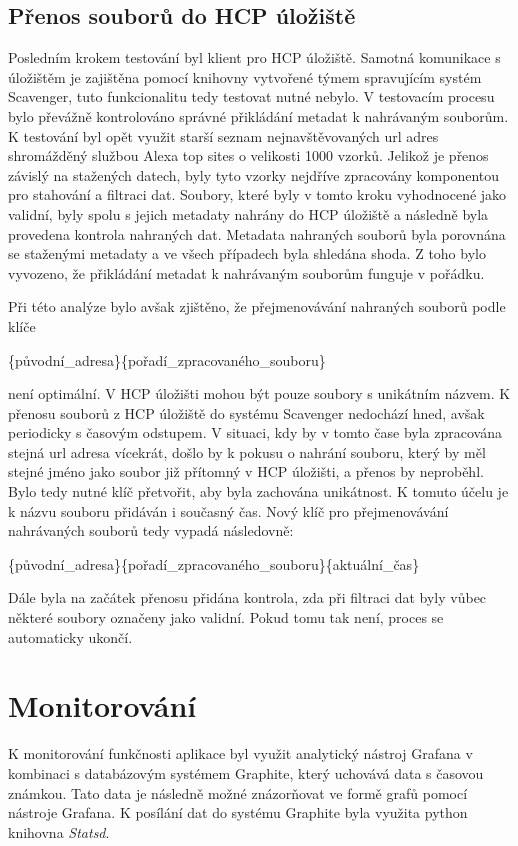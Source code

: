\documentclass[thesis=M,czech,hidelinks]{FITthesis}[2013/05/06]
\begin{document}
\subsection{Přenos souborů do HCP úložiště}
Posledním krokem testování byl klient pro HCP úložiště. Samotná komunikace s úložištěm je zajištěna pomocí knihovny vytvořené týmem spravujícím systém Scavenger, tuto funkcionalitu tedy testovat nutné nebylo. V testovacím procesu bylo převážně kontrolováno správné přikládání metadat k nahrávaným souborům. K testování byl opět využit starší seznam nejnavštěvovaných url adres shromážděný službou Alexa top sites\cite{alexa} o velikosti 1000 vzorků. Jelikož je přenos závislý na stažených datech, byly tyto vzorky nejdříve zpracovány komponentou pro stahování a filtraci dat. Soubory, které byly v tomto kroku vyhodnocené jako validní, byly spolu s jejich metadaty nahrány do HCP úložiště a následně byla provedena kontrola nahraných dat. Metadata nahraných souborů byla porovnána se staženými metadaty a ve všech případech byla shledána shoda. Z toho bylo vyvozeno, že přikládání metadat k nahrávaným souborům funguje v pořádku. 

Při této analýze bylo avšak zjištěno, že přejmenovávání nahraných souborů podle klíče
\begin{center}\label{prej}
\{původní\_adresa\}\{pořadí\_zpracovaného\_souboru\}
\end{center}
 není optimální. V HCP úložišti mohou být pouze soubory s unikátním názvem. K přenosu souborů z HCP úložiště do systému Scavenger nedochází hned, avšak periodicky s časovým odstupem. V situaci, kdy by v tomto čase byla zpracována stejná url adresa vícekrát, došlo by k pokusu o nahrání souboru, který by měl stejné jméno jako soubor již přítomný v HCP úložišti, a přenos by neproběhl. Bylo tedy nutné klíč přetvořit, aby byla zachována unikátnost. K tomuto účelu je k názvu souboru přidáván i současný čas. Nový klíč pro přejmenovávání nahrávaných souborů tedy vypadá následovně: 
\begin{center}\label{prejm}
\{původní\_adresa\}\{pořadí\_zpracovaného\_souboru\}\{aktuální\_čas\}
\end{center}

Dále byla na začátek přenosu přidána kontrola, zda při filtraci dat byly vůbec některé soubory označeny jako validní. Pokud tomu tak není, proces se automaticky ukončí.


\section{Monitorování}\label{monitoring}
K monitorování funkčnosti aplikace byl využit analytický nástroj Grafana\cite{grafana} v kombinaci s databázovým systémem Graphite\cite{graphite}, který uchovává data s časovou známkou. Tato data je následně možné znázorňovat ve formě grafů pomocí nástroje Grafana. K posílání dat do systému Graphite byla využita python knihovna \textit{Statsd}\cite{statistika}.
\end{document}
